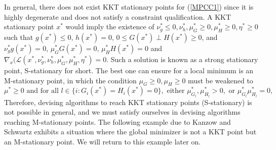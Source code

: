 \documentclass[12pt]{article}
\newcommand{\pref}[1]{(\ref{#1})}
\begin{document}
In general, there does not exist KKT stationary points for \pref{MPCC1} since it is highly degenerate and does not satisfy a constraint qualification. A KKT stationary point $x^*$ would imply the existence of $\nu_g^*\le0,\nu_h^*,\mu_{G}^*\ge0,\mu_{H}^*\ge0,\eta^*\ge0$ such that $g(x^*)\le0$, $h(x^*)=0$, $0\leq G(x^*)\perp H(x^*)\geq0$, and $\nu_g^*g(x^*)=0$, $\mu_G^*G(x^*)=0$, $\mu_H^*H(x^*)=0$ and $\nabla_x(\mathcal{L}(x^*,\nu_g^*,\nu_h^*,\mu_{G}^*,\mu_{H}^*,\eta^*)=0$. Such a solution is known as a strong stationary point, S-stationary for short. The best one can ensure for a local minimum is an M-stationary point, in which the condition $\mu_{G}\ge0,\mu_{H}\ge0$ must be weakened to 
\begin{equation}\label{Mstat}
 \mu^{*}\geq0 \textrm{  and for all } l\in \{i:G_i(x^*)=H_i(x^*)=0\}, \textrm{ either }\mu_{G_l}^{*}, \mu_{H_l}^{*}>0, \textrm{ or }\mu_{G_l}^{*}\mu_{H_l}^{*}=0,
\end{equation}
Therefore, devising algorithms to reach KKT stationary points (S-stationary) is not possible in general, and we must satisfy ourselves in devising algorithms reaching M-stationary points. The following example due to Kanzow and Schwartz exhibits a situation where the global minimizer is not a KKT point but an M-stationary point. We will return to this example later on. 
\end{document}

